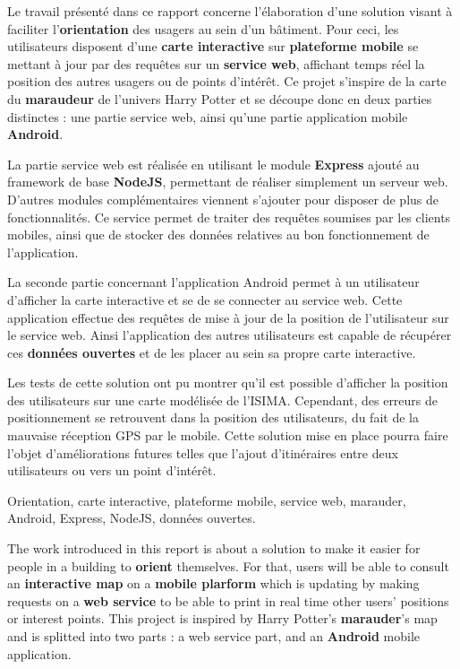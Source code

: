 

Le travail présenté dans ce rapport concerne l'élaboration d'une solution visant à faciliter l’\textbf{orientation} des usagers au sein d'un bâtiment. Pour ceci, les utilisateurs disposent d'une \textbf{carte interactive} sur \textbf{plateforme mobile} se mettant à jour par des requêtes sur un \textbf{service web}, affichant temps réel la position des autres usagers ou de points d’intérêt. Ce projet s’inspire de la carte du \textbf{maraudeur} de l’univers Harry Potter et se découpe donc en deux parties distinctes : une partie service web, ainsi qu'une partie application mobile \textbf{Android}.

La partie service web est réalisée en utilisant le module \textbf{Express} ajouté au framework de base \textbf{NodeJS}, permettant de réaliser simplement un serveur web. D'autres modules complémentaires viennent s'ajouter pour disposer de plus de fonctionnalités. Ce service permet de traiter des requêtes soumises par les clients mobiles, ainsi que de stocker des données relatives au bon fonctionnement de l'application.

La seconde partie concernant l'application Android permet à un utilisateur d’afficher la carte interactive et se de se connecter au service web. Cette application effectue des requêtes de mise à jour de la position de l'utilisateur sur le service web. Ainsi l’application des autres utilisateurs est capable de récupérer ces \textbf{données ouvertes} et de les placer au sein sa propre carte interactive.

Les tests de cette solution ont pu montrer qu'il est possible d'afficher la position des utilisateurs sur une carte modélisée de l'ISIMA. Cependant, des erreurs de positionnement se retrouvent dans la position des utilisateurs, du fait de la mauvaise réception GPS par le mobile. Cette solution mise en place pourra faire l'objet d'améliorations futures telles que l'ajout d'itinéraires entre deux utilisateurs ou vers un point d'intérêt.

Orientation, carte interactive, plateforme mobile, service web, marauder, Android, Express, NodeJS, données ouvertes.



The work introduced in this report is about a solution to make it easier for people in a building to \textbf{orient} themselves. For that, users will be able to consult an \textbf{interactive map} on a \textbf{mobile plarform} which is updating by making requests on a \textbf{web service} to be able to print in real time other users' positions or interest points. This project is inspired by Harry Potter's \textbf{marauder}'s map and is splitted into two parts : a web service part, and an \textbf{Android} mobile application.

